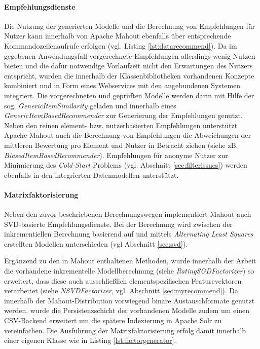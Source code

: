 \paragraph{Empfehlungsdienste} Die Nutzung der generierten Modelle und die Berechnung von Empfehlungen für Nutzer kann innerhalb von Apache Mahout ebenfalls über entsprechende Kommandozeilenaufrufe erfolgen (vgl. Listing \ref{lst:datarecommend}). Da im gegebenen Anwendungsfall vorgerechnete Empfehlungen allerdings wenig Nutzen bieten und die dafür notwendige Vorlaufzeit nicht den Erwartungen des Nutzers entspricht, wurden die innerhalb der Klassenbibliotheken vorhandenen Konzepte kombiniert und in Form eines Webservices mit den angebundenen Systemen integriert. Die vorgerechneten und geprüften Modelle werden darin mit Hilfe der sog. \textit{GenericItemSimilarity} geladen und innerhalb eines \textit{GenericItemBasedRecommender} zur Generierung der Empfehlungen genutzt. Neben den reinen element- bzw. nutzerbasierten Empfehlungen unterstützt Apache Mahout auch die Berechnung von Empfehlungen die Abweichungen der mittleren Bewertung pro Element und Nutzer in Betracht ziehen (siehe zB. \textit{BiasedItemBasedRecommender}). Empfehlungen für anonyme Nutzer zur Minimierung des \textit{Cold-Start} Problems (vgl. Abschnitt \ref{sec:filterissues}) werden ebenfalls in den integrierten Datenmodellen unterstützt. 

 

\paragraph{Matrixfaktorisierung} Neben den zuvor beschriebenen Berechnungswegen implementiert Mahout auch \acs{SVD}-basierte Empfehlungsdienste. Bei der Berechnung wird zwischen der inkrementiellen Berechnung basierend auf \citep{funk2006}  und mittels \textit{Alternating Least Squares} \citep{Bell:2007:SCF:1441428.1442050,zhou08} erstellten Modellen unterschieden (vgl Abschnitt \ref{sec:svd}). 



Ergänzend zu den in Mahout enthaltenen Methoden, wurde innerhalb der Arbeit die vorhandene inkrementelle Modellberechnung (siehe \textit{RatingSGDFactorizer}) so erweitert, dass diese auch ausschließlich elementspezifischen Featurevektoren verarbeitet (siehe \textit{NSVDFactorizer}, vgl. Abschnitt \ref{sec:myrecommend}). Da innerhalb der Mahout-Distribution vorwiegend binäre Austauschformate genutzt werden, wurde die Persistenzschicht der vorhandenen Modelle zudem um einen CSV-Backend erweitert um die spätere Indexierung in Apache Solr zu vereinfachen. Die Ausführung der Matrixfaktorisierung erfolg damit innerhalb einer eigenen Klasse wie in Listing \ref{lst:factorgenerator}.

